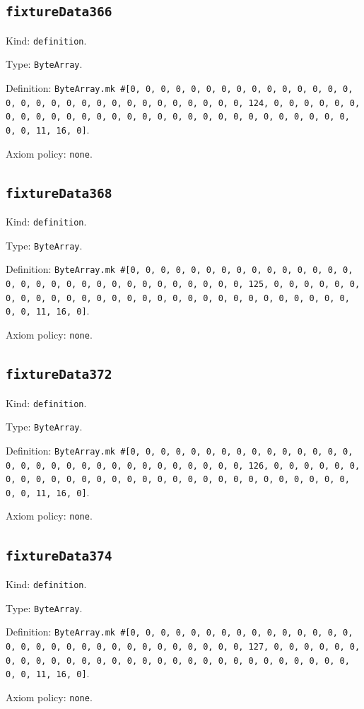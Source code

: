 \documentclass[11pt]{article}
\begin{document}
\subsection*{\texttt{fixtureData366}}
\noindent Kind: \texttt{definition}.\par
\noindent Type: \texttt{ByteArray}.\par
\noindent Definition: \texttt{ByteArray.mk \#[0, 0, 0, 0, 0, 0, 0, 0, 0, 0, 0, 0, 0, 0, 0, 0, 0, 0, 0, 0, 0, 0, 0, 0, 0, 0, 0, 0, 0, 0, 0, 124, 0, 0, 0, 0, 0, 0, 0, 0, 0, 0, 0, 0, 0, 0, 0, 0, 0, 0, 0, 0, 0, 0, 0, 0, 0, 0, 0, 0, 0, 0, 0, 11, 16, 0]}.\par
\noindent Axiom policy: \texttt{none}.\par
\subsection*{\texttt{fixtureData368}}
\noindent Kind: \texttt{definition}.\par
\noindent Type: \texttt{ByteArray}.\par
\noindent Definition: \texttt{ByteArray.mk \#[0, 0, 0, 0, 0, 0, 0, 0, 0, 0, 0, 0, 0, 0, 0, 0, 0, 0, 0, 0, 0, 0, 0, 0, 0, 0, 0, 0, 0, 0, 0, 125, 0, 0, 0, 0, 0, 0, 0, 0, 0, 0, 0, 0, 0, 0, 0, 0, 0, 0, 0, 0, 0, 0, 0, 0, 0, 0, 0, 0, 0, 0, 0, 11, 16, 0]}.\par
\noindent Axiom policy: \texttt{none}.\par
\subsection*{\texttt{fixtureData372}}
\noindent Kind: \texttt{definition}.\par
\noindent Type: \texttt{ByteArray}.\par
\noindent Definition: \texttt{ByteArray.mk \#[0, 0, 0, 0, 0, 0, 0, 0, 0, 0, 0, 0, 0, 0, 0, 0, 0, 0, 0, 0, 0, 0, 0, 0, 0, 0, 0, 0, 0, 0, 0, 126, 0, 0, 0, 0, 0, 0, 0, 0, 0, 0, 0, 0, 0, 0, 0, 0, 0, 0, 0, 0, 0, 0, 0, 0, 0, 0, 0, 0, 0, 0, 0, 11, 16, 0]}.\par
\noindent Axiom policy: \texttt{none}.\par
\subsection*{\texttt{fixtureData374}}
\noindent Kind: \texttt{definition}.\par
\noindent Type: \texttt{ByteArray}.\par
\noindent Definition: \texttt{ByteArray.mk \#[0, 0, 0, 0, 0, 0, 0, 0, 0, 0, 0, 0, 0, 0, 0, 0, 0, 0, 0, 0, 0, 0, 0, 0, 0, 0, 0, 0, 0, 0, 0, 127, 0, 0, 0, 0, 0, 0, 0, 0, 0, 0, 0, 0, 0, 0, 0, 0, 0, 0, 0, 0, 0, 0, 0, 0, 0, 0, 0, 0, 0, 0, 0, 11, 16, 0]}.\par
\noindent Axiom policy: \texttt{none}.\par
\end{document}

